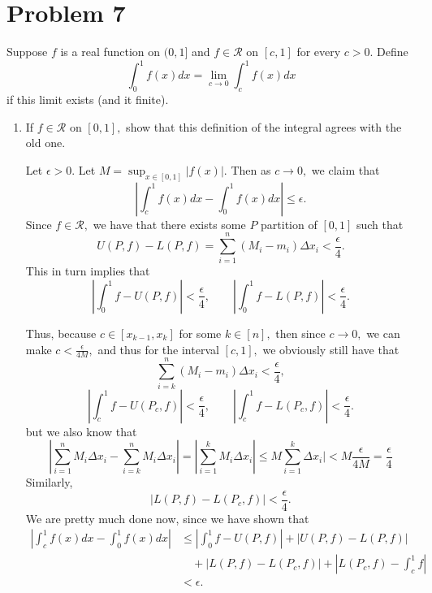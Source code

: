 \documentclass[11pt]{article}
\begin{document}
\section*{Problem 7}
\begin{problem}
    Suppose $f$ is a real function on $(0,1]$ and $f\in \mathcal{R}$ on $[c,1]$ for every $c>0.$ Define 
    \[\int_0^1 f(x)dx = \lim_{c\to 0}\int_c^1 f(x)dx\] if this limit exists (and it finite).
\end{problem}
\begin{enumerate}
    \item 
    \begin{problem}
        If $f\in \mathcal{R}$ on $[0,1],$ show that this definition of the integral agrees with the old one.
    \end{problem}
    \begin{solution}
        Let $\epsilon>0.$ Let $M= \sup_{x\in [0,1]} |f(x)|.$ Then as $c\to 0,$ we claim that
        \[\left|\int_c^1 f(x)dx - \int_0^1 f(x)dx\right| \leq \epsilon.\] Since $f\in \mathcal{R},$ we have that there exists some $P$ partition of $[0,1]$ such that 
        \[U(P,f) - L(P,f) = \sum_{i=1}^n (M_i - m_i)\Delta x_i < \frac{\epsilon}{4}.\] This in turn implies that 
        \[|\int_0^1 f - U(P,f)| < \frac{\epsilon}{4}, \qquad |\int_0^1 f - L(P,f)|< \frac{\epsilon}{4}.\]
        
        Thus, because $c\in [x_{k-1}, x_k]$ for some $k\in [n],$ then since $c\to 0,$ we can make $c< \frac{\epsilon}{4M},$ and thus for the interval $[c,1],$ we obviously still have that 
        \[\sum_{i=k}^n (M_i - m_i)\Delta x_i < \frac{\epsilon}{4},\] 
        \[|\int_c^1 f - U(P_c,f)| < \frac{\epsilon}{4}, \qquad |\int_c^1 f - L(P_c,f)|< \frac{\epsilon}{4}.\]
        but we also know that 
        \[|\sum_{i=1}^n M_i \Delta x_i - \sum_{i=k}^n M_i \Delta x_i| = |\sum_{i=1}^k M_i \Delta x_i|\leq M\sum_{i=1}^k \Delta x_i| < M\frac{\epsilon}{4M} = \frac{\epsilon}{4}\] Similarly, 
        \[|L(P,f) - L(P_c,f)| < \frac{\epsilon}{4}.\] We are pretty much done now, since we have shown that
        \begin{align*}
        \left|\int_c^1 f(x)dx - \int_0^1 f(x)dx\right| &\leq \left| \int_0^1 f - U(P,f)\right| + \left|U(P,f) - L(P,f)\right|\\
        &\quad + \left|L(P,f) - L(P_c,f)\right| + \left|L(P_c, f) - \int_c^1 f\right|\\
        &< \epsilon.
        \end{align*}
    

\end{solution}
\end{enumerate}
\end{document}
